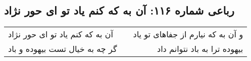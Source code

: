 \begin{center}
\section*{رباعی شماره ۱۱۶: آن به که کنم یاد تو ای حور نژاد}
\label{sec:sh116}
\begin{longtable}{l p{0.5cm} r}
آن به که کنم یاد تو ای حور نژاد
&&
و آن به که نیارم از جفاهای تو یاد
\\
گر چه به خیال تست بیهوده و باد
&&
بیهوده ترا به باد نتوانم داد
\\
\end{longtable}
\end{center}

